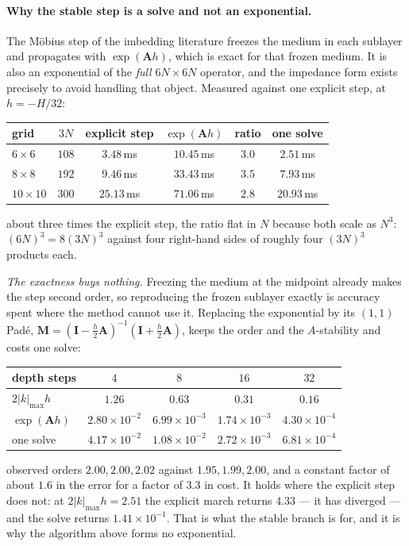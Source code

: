 \documentclass[11pt,a4paper]{article}
\newcommand{\bI}{\mathbf{I}}
\newcommand{\bA}{\mathbf{A}}
\begin{document}
\paragraph{Why the stable step is a solve and not an exponential.}  The
M\"obius step of the imbedding literature freezes the medium in each sublayer
and propagates with $\exp(\bA h)$, which is exact for that frozen medium.  It is
also an exponential of the \emph{full} $6N\times6N$ operator, and the impedance
form exists precisely to avoid handling that object.  Measured against one
explicit step, at $h=-H/32$:
\begin{center}
\begin{tabular}{@{}lccccc@{}}
\toprule
grid & $3N$ & explicit step & $\exp(\bA h)$ & ratio & one solve \\
\midrule
$6\times6$   & $108$ & $3.48$\,ms & $10.45$\,ms & $3.0$ & $2.51$\,ms \\
$8\times8$   & $192$ & $9.46$\,ms & $33.43$\,ms & $3.5$ & $7.93$\,ms \\
$10\times10$ & $300$ & $25.13$\,ms & $71.06$\,ms & $2.8$ & $20.93$\,ms \\
\bottomrule
\end{tabular}
\end{center}
about three times the explicit step, the ratio flat in $N$ because both scale as
$N^{3}$: $(6N)^{3}=8(3N)^{3}$ against four right-hand sides of roughly four
$(3N)^{3}$ products each.

\emph{The exactness buys nothing.}  Freezing the medium at the midpoint already
makes the step second order, so reproducing the frozen sublayer exactly is
accuracy spent where the method cannot use it.  Replacing the exponential by its
$(1,1)$ Pad\'e,
$\mathbf{M}=(\bI-\tfrac{h}{2}\bA)^{-1}(\bI+\tfrac{h}{2}\bA)$, keeps the order
and the $A$-stability and costs one solve:
\begin{center}
\begin{tabular}{@{}lcccc@{}}
\toprule
depth steps & $4$ & $8$ & $16$ & $32$ \\
\midrule
$2|k|_{\max}h$ & $1.26$ & $0.63$ & $0.31$ & $0.16$ \\
$\exp(\bA h)$ & $2.80\times10^{-2}$ & $6.99\times10^{-3}$
              & $1.74\times10^{-3}$ & $4.30\times10^{-4}$ \\
one solve     & $4.17\times10^{-2}$ & $1.08\times10^{-2}$
              & $2.72\times10^{-3}$ & $6.81\times10^{-4}$ \\
\bottomrule
\end{tabular}
\end{center}
observed orders $2.00,2.00,2.02$ against $1.95,1.99,2.00$, and a constant factor
of about $1.6$ in the error for a factor of $3.3$ in cost.  It holds where the
explicit step does not: at $2|k|_{\max}h = 2.51$ the explicit march returns
$4.33$ --- it has diverged --- and the solve returns $1.41\times10^{-1}$.  That
is what the stable branch is for, and it is why the algorithm above forms no
exponential.
\end{document}
